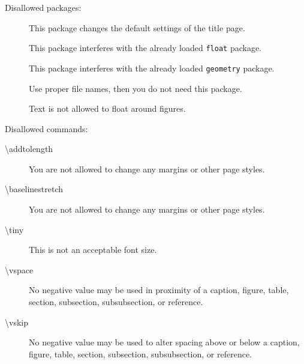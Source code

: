 \documentclass[
    language=german, %
    thesis=bachelor, %
    supervisor=postdoc, %
    multiauthor=false, %
    ]{settings/csssa-thesis}
\begin{document}
Disallowed packages:
\begin{description}
    \item[] This package changes the default settings of the title page.
    \item[] This package interferes with the already loaded \texttt{float} package.
    \item[] This package interferes with the already loaded \texttt{geometry} package.
    \item[] Use proper file names, then you do not need this package.
    \item[] Text is not allowed to float around figures.
\end{description}

Disallowed commands:
\begin{description}
    \item[\textbackslash{}addtolength] You are not allowed to change any margins or other page styles.
    \item[\textbackslash{}baselinestretch] You are not allowed to change any margins or other page styles.
    \item[\textbackslash{}tiny] This is not an acceptable font size.
    \item[\textbackslash{}vspace] No negative value may be used in proximity of a caption, figure, table, section, subsection, subsubsection, or reference.
    \item[\textbackslash{}vskip] No negative value may be used to alter spacing above or below a caption, figure, table, section, subsection, subsubsection, or reference.
\end{description}


\printbibliography[heading=header]
\backmatter     

\end{document}
